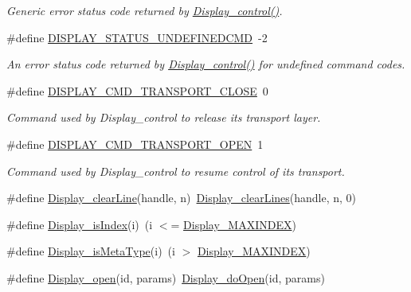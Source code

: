 \begin{DoxyCompactItemize}
\begin{DoxyCompactList}\small\item\em Generic error status code returned by \hyperlink{_display_8h_ad623d21e3c6d821bf6f4bdcfa05ec21f}{Display\+\_\+control()}. \end{DoxyCompactList}\item 
\#define \hyperlink{group___d_i_s_p_l_a_y___s_t_a_t_u_s_ga3e506301dbdad496a95e12c3b17efc6b}{D\+I\+S\+P\+L\+A\+Y\+\_\+\+S\+T\+A\+T\+U\+S\+\_\+\+U\+N\+D\+E\+F\+I\+N\+E\+D\+C\+M\+D}~-\/2
\begin{DoxyCompactList}\small\item\em An error status code returned by \hyperlink{_display_8h_ad623d21e3c6d821bf6f4bdcfa05ec21f}{Display\+\_\+control()} for undefined command codes. \end{DoxyCompactList}\item 
\#define \hyperlink{group___d_i_s_p_l_a_y___c_m_d_ga5be24ea4a3ddfd94efbb513d649ac88b}{D\+I\+S\+P\+L\+A\+Y\+\_\+\+C\+M\+D\+\_\+\+T\+R\+A\+N\+S\+P\+O\+R\+T\+\_\+\+C\+L\+O\+S\+E}~0
\begin{DoxyCompactList}\small\item\em Command used by Display\+\_\+control to release its transport layer. \end{DoxyCompactList}\item 
\#define \hyperlink{group___d_i_s_p_l_a_y___c_m_d_gae12206be356c6b2ce885b5ada9b1854d}{D\+I\+S\+P\+L\+A\+Y\+\_\+\+C\+M\+D\+\_\+\+T\+R\+A\+N\+S\+P\+O\+R\+T\+\_\+\+O\+P\+E\+N}~1
\begin{DoxyCompactList}\small\item\em Command used by Display\+\_\+control to resume control of its transport. \end{DoxyCompactList}\item 
\#define \hyperlink{_display_8h_a4dacdea7e09ccbb7fc6464bb9af6c2cd}{Display\+\_\+clear\+Line}(handle,  n)~\hyperlink{_display_8h_abae2ae910c2c533dbf11d24c656609d1}{Display\+\_\+clear\+Lines}(handle, n, 0)
\item 
\#define \hyperlink{_display_8h_a1c085d5459020e806cafd71632e3d8ed}{Display\+\_\+is\+Index}(i)~(i $<$= \hyperlink{_display_8h_a61eb3c7b2406cb61825a0924b066d1ec}{Display\+\_\+\+M\+A\+X\+I\+N\+D\+E\+X})
\item 
\#define \hyperlink{_display_8h_ac0fca232ed955fd16bdf1d7b1b560a9e}{Display\+\_\+is\+Meta\+Type}(i)~(i $>$ \hyperlink{_display_8h_a61eb3c7b2406cb61825a0924b066d1ec}{Display\+\_\+\+M\+A\+X\+I\+N\+D\+E\+X})
\item 
\#define \hyperlink{_display_8h_a3aa87973a354d4fd6a2969f764e8afe6}{Display\+\_\+open}(id,  params)~\hyperlink{_display_8h_a3e9f4eee43bc9b70a4944e1a3961f7d2}{Display\+\_\+do\+Open}(id, params)

\end{DoxyCompactItemize}
